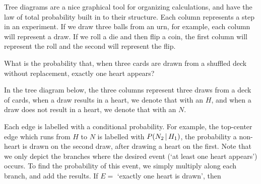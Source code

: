 Tree diagrams are a nice graphical tool for organizing calculations, and have the law of total probability built in to their structure. Each column represents a step in an experiment. If we draw three balls from an urn, for example, each column will represent a draw. If we roll a die and then flip a coin, the first column will represent the roll and the second will represent the flip.

\begin{examp}
What is the probability that, when three cards are drawn from a shuffled deck without replacement, exactly one heart appears?
\par
\noindent In the tree diagram below, the three columns represent three draws from a deck of cards, when a draw results in a heart, we denote that with an $H$, and when a draw does not result in a heart, we denote that with an $N$.
\begin{center}
\end{center}
\par
\noindent Each edge is labelled with a conditional probability. For example, the top-center edge which runs from $H$ to $N$ is labelled with $P(N_2 \,|\, H_1)$, the probability a non-heart is drawn on the second draw, after drawing a heart on the first. Note that we only depict the branches where the desired event (`at least one heart appears') occurs. To find the probability of this event, we simply multiply along each branch, and add the results. If $E =$ `exactly one heart is drawn', then
\end{examp}
